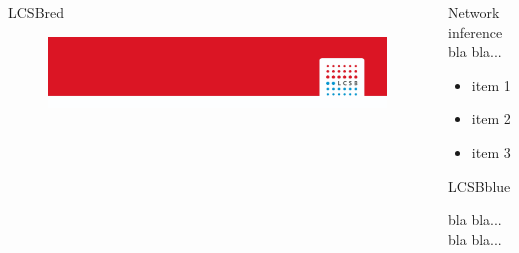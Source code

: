 \documentclass[final]{beamer}
\newlength{\sepwid}
\newlength{\twocolwid}
\newcommand{\bluebullet}{\raisebox{1.5mm}{$\bullet$}\hspace{0.3cm}}
\begin{document}
\begin{frame}[t]
\begin{columns}[t]
\begin{column}{\twocolwid}
\begin{myblock}{LCSBred}
        \begin{figure}[htb]   %
          \centering
          \includegraphics[width=.8\textwidth]{poster-layout/top-red}
        \end{figure}
        \vspace*{.5cm}
      \end{myblock}

    \end{column}%



    \begin{column}{\twocolwid}
      \vspace{1.55cm}

      \begin{block}{\textsf{Network inference}}
        \large
        bla bla...

        \begin{itemize}
        \item[\bluebullet] item 1
        \item[\bluebullet] item 2
        \item[\bluebullet] item 3
        \end{itemize}

        \vspace*{2.7cm}
        \begin{myblock}{LCSBblue}
          \vspace*{.3cm}
          \begin{minipage}[t]{.95\textwidth}
            \begin{algorithmic}[1]
              \State bla bla...
              \State bla bla...
            \end{algorithmic}
          \end{minipage}
          \vspace*{.3cm}
        \end{myblock}


\end{block}
\end{column}
\end{columns}
\end{frame}
\end{document}
